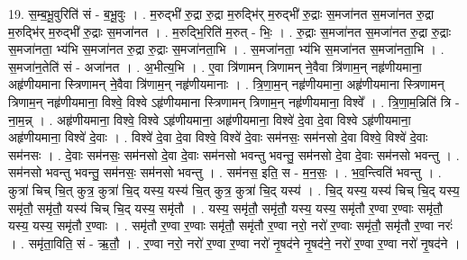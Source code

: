 \documentclass[17pt]{extarticle}
\begin{document}
19. स॒म्ब॒भू॒वुरिति॑ सं - ब॒भू॒वुः । . म॒रुद्भी॑ रु॒द्रा रु॒द्रा म॒रुद्भि॑र् म॒रुद्भी॑ रु॒द्राः स॒मजा॑नत स॒मजा॑नत रु॒द्रा म॒रुद्भि॑र् म॒रुद्भी॑ रु॒द्राः स॒मजा॑नत । . म॒रुद्भि॒रिति॑ म॒रुत् - भिः॒ । . रु॒द्राः स॒मजा॑नत स॒मजा॑नत रु॒द्रा रु॒द्राः स॒मजा॑नता॒ भ्य॑भि स॒मजा॑नत रु॒द्रा रु॒द्राः स॒मजा॑नता॒भि । . स॒मजा॑नता॒ भ्य॑भि स॒मजा॑नत स॒मजा॑नता॒भि । . स॒मजा॑न॒तेति॑ सं - अजा॑नत । . अ॒भीत्य॒भि । . ए॒वा त्रि॑णामन् त्रिणामन् ने॒वैवा त्रि॑णाम॒न् नहृ॑णीयमाना॒ अहृ॑णीयमाना स्त्रिणामन् ने॒वैवा त्रि॑णाम॒न् नहृ॑णीयमानाः । . त्रि॒णा॒म॒न् नहृ॑णीयमाना॒ अहृ॑णीयमाना स्त्रिणामन् त्रिणाम॒न् नहृ॑णीयमाना॒ विश्वे॒ विश्वे ऽहृ॑णीयमाना स्त्रिणामन् त्रिणाम॒न् नहृ॑णीयमाना॒ विश्वे᳚ । . त्रि॒णा॒म॒न्निति॑ त्रि - ना॒म॒न्न् । . अहृ॑णीयमाना॒ विश्वे॒ विश्वे ऽहृ॑णीयमाना॒ अहृ॑णीयमाना॒ विश्वे॑ दे॒वा दे॒वा विश्वे ऽहृ॑णीयमाना॒ अहृ॑णीयमाना॒ विश्वे॑ दे॒वाः । . विश्वे॑ दे॒वा दे॒वा विश्वे॒ विश्वे॑ दे॒वाः सम॑नसः॒ सम॑नसो दे॒वा विश्वे॒ विश्वे॑ दे॒वाः सम॑नसः । . दे॒वाः सम॑नसः॒ सम॑नसो दे॒वा दे॒वाः सम॑नसो भवन्तु भवन्तु॒ सम॑नसो दे॒वा दे॒वाः सम॑नसो भवन्तु । . सम॑नसो भवन्तु भवन्तु॒ सम॑नसः॒ सम॑नसो भवन्तु । . सम॑नस॒ इति॒ स - म॒न॒सः॒ । . भ॒व॒न्त्विति॑ भवन्तु । . कुत्रा॑ चिच् चि॒त् कुत्र॒ कुत्रा॑ चि॒द् यस्य॒ यस्य॑ चि॒त् कुत्र॒ कुत्रा॑ चि॒द् यस्य॑ । . चि॒द् यस्य॒ यस्य॑ चिच् चि॒द् यस्य॒ समृ॑तौ॒ समृ॑तौ॒ यस्य॑ चिच् चि॒द् यस्य॒ समृ॑तौ । . यस्य॒ समृ॑तौ॒ समृ॑तौ॒ यस्य॒ यस्य॒ समृ॑तौ र॒ण्वा र॒ण्वाः समृ॑तौ॒ यस्य॒ यस्य॒ समृ॑तौ र॒ण्वाः । . समृ॑तौ र॒ण्वा र॒ण्वाः समृ॑तौ॒ समृ॑तौ र॒ण्वा नरो॒ नरो॑ र॒ण्वाः समृ॑तौ॒ समृ॑तौ र॒ण्वा नरः॑ । . समृ॑ता॒विति॒ सं - ऋ॒तौ॒ । . र॒ण्वा नरो॒ नरो॑ र॒ण्वा र॒ण्वा नरो॑ नृ॒षद॑ने नृ॒षद॑ने॒ नरो॑ र॒ण्वा र॒ण्वा नरो॑ नृ॒षद॑ने । \newline
\end{document}
